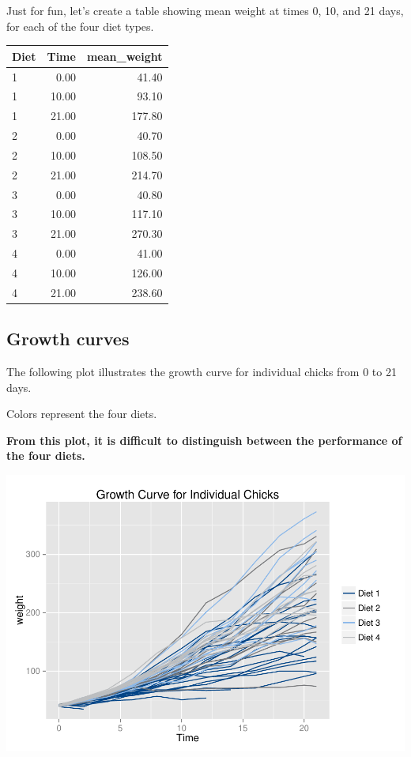 \documentclass[10pt]{article}
\newenvironment{CodeChunk}{}{}
\begin{document}
Just for fun, let's create a table showing mean weight at times 0, 10,
and 21 days, for each of the four diet types.

\begin{table}[h]
\centering
\begin{tabular}{lrr}
  \hline
Diet & Time & mean\_weight \\ 
  \hline
1 & 0.00 & 41.40 \\ 
  1 & 10.00 & 93.10 \\ 
  1 & 21.00 & 177.80 \\ 
  2 & 0.00 & 40.70 \\ 
  2 & 10.00 & 108.50 \\ 
  2 & 21.00 & 214.70 \\ 
  3 & 0.00 & 40.80 \\ 
  3 & 10.00 & 117.10 \\ 
  3 & 21.00 & 270.30 \\ 
  4 & 0.00 & 41.00 \\ 
  4 & 10.00 & 126.00 \\ 
  4 & 21.00 & 238.60 \\ 
   \hline
\end{tabular}
\end{table}

\subsection*{Growth curves}\label{growth-curves}

The following plot illustrates the growth curve for individual chicks
from 0 to 21 days.

Colors represent the four diets.

\textbf{From this plot, it is difficult to distinguish between the
performance of the four diets.}

\begin{CodeChunk}

\includegraphics{Reproducible_Research_Demo_for_PLoS_files/figure-latex/unnamed-chunk-8-1} \end{CodeChunk}
\end{document}
